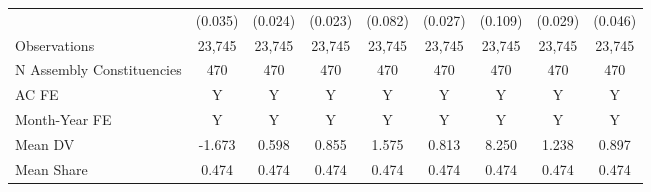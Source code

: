 {\begin{tabular}{l*{8}{c}}
            &     (0.035)         &     (0.024)         &     (0.023)         &     (0.082)         &     (0.027)         &     (0.109)         &     (0.029)         &     (0.046)         \\
Observations&      23,745         &      23,745         &      23,745         &      23,745         &      23,745         &      23,745         &      23,745         &      23,745         \\
N Assembly Constituencies&         470         &         470         &         470         &         470         &         470         &         470         &         470         &         470         \\
AC FE       &           Y         &           Y         &           Y         &           Y         &           Y         &           Y         &           Y         &           Y         \\
Month-Year FE&           Y         &           Y         &           Y         &           Y         &           Y         &           Y         &           Y         &           Y         \\
Mean DV     &      -1.673         &       0.598         &       0.855         &       1.575         &       0.813         &       8.250         &       1.238         &       0.897         \\
Mean Share  &       0.474         &       0.474         &       0.474         &       0.474         &       0.474         &       0.474         &       0.474         &       0.474         \\
\bottomrule
\end{tabular}
}
